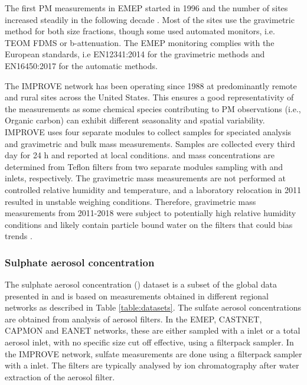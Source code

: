 \documentclass[acp, manuscript]{copernicus}
\begin{document}
The first PM measurements in EMEP started in 1996 and the number of sites increased steadily in the following decade \citep{torseth2012}. Most of the sites use the gravimetric method for both size fractions, though some used automated monitors, i.e. TEOM FDMS or b-attenuation. The EMEP monitoring complies with the European standards, i.e EN12341:2014 for the gravimetric methods and  EN16450:2017 for the automatic methods. 

The IMPROVE network has been operating since 1988 at predominantly remote and rural sites across the United States. This ensures a good representativity of the measurements as some chemical species contributing to PM observations (i.e., Organic carbon) can exhibit different seasonality and spatial variability. IMPROVE uses four separate modules to collect samples for speciated  analysis and gravimetric  and  bulk mass measurements. Samples are collected every third day for 24 h and reported at local conditions.  and  mass concentrations are determined from Teflon filters from two separate modules sampling with  and  inlets, respectively. The gravimetric mass measurements are not performed at controlled relative humidity and temperature, and a laboratory relocation in 2011 resulted in unstable weighing conditions. Therefore, gravimetric mass measurements from 2011-2018 were subject to potentially high relative humidity conditions and likely contain particle bound water on the filters that could bias trends \citep{Hand2019}.

\subsubsection{Sulphate aerosol concentration}
 The sulphate aerosol concentration () dataset is a subset of the global data presented in \cite{aas2019global} and is based on measurements obtained in different regional networks as described in Table \ref{table:datasets}. The sulfate aerosol concentrations are obtained from analysis of aerosol filters. In the EMEP, CASTNET, CAPMON and EANET networks, these are either sampled with a  inlet or a total aerosol inlet, with no specific size cut off effective, using a filterpack sampler.  In the IMPROVE network, sulfate measurements are done using a filterpack sampler with a  inlet. The filters are typically analysed by ion chromatography after water extraction of the aerosol filter.
\end{document}
